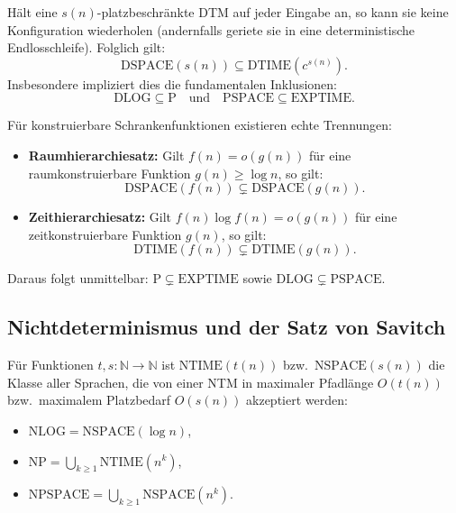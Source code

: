 \begin{theorem}
    Hält eine $s(n)$-platzbeschränkte DTM auf jeder Eingabe an, so kann sie keine Konfiguration wiederholen (andernfalls geriete sie in eine deterministische Endlosschleife). Folglich gilt:
    \[
        \mathrm{DSPACE}(s(n)) \subseteq \mathrm{DTIME}(c^{s(n)}).
    \]
    Insbesondere impliziert dies die fundamentalen Inklusionen:
    \[
        \mathrm{DLOG} \subseteq \mathrm{P} \quad \text{und} \quad \mathrm{PSPACE} \subseteq \mathrm{EXPTIME}.
    \]
\end{theorem}

\begin{theorem}
    Für konstruierbare Schrankenfunktionen existieren echte Trennungen:
    \begin{itemize}
        \item \textbf{Raumhierarchiesatz:} Gilt $f(n) = o(g(n))$ für eine raumkonstruierbare Funktion $g(n) \ge \log n$, so gilt:
        \[
            \mathrm{DSPACE}(f(n)) \subsetneq \mathrm{DSPACE}(g(n)).
        \]
        \item \textbf{Zeithierarchiesatz:} Gilt $f(n) \log f(n) = o(g(n))$ für eine zeitkonstruierbare Funktion $g(n)$, so gilt:
        \[
            \mathrm{DTIME}(f(n)) \subsetneq \mathrm{DTIME}(g(n)).
        \]
    \end{itemize}
    Daraus folgt unmittelbar: $\mathrm{P} \subsetneq \mathrm{EXPTIME}$ sowie $\mathrm{DLOG} \subsetneq \mathrm{PSPACE}$.
\end{theorem}

\subsection{Nichtdeterminismus und der Satz von Savitch}

\begin{definition}
    Für Funktionen $t, s : \mathbb{N} \to \mathbb{N}$ ist $\mathrm{NTIME}(t(n))$ bzw.\ $\mathrm{NSPACE}(s(n))$ die Klasse aller Sprachen, die von einer NTM in maximaler Pfadlänge $O(t(n))$ bzw.\ maximalem Platzbedarf $O(s(n))$ akzeptiert werden:
    \begin{itemize}
        \item $\mathrm{NLOG} = \mathrm{NSPACE}(\log n)$,
        \item $\mathrm{NP} = \bigcup_{k \ge 1} \mathrm{NTIME}(n^k)$,
        \item $\mathrm{NPSPACE} = \bigcup_{k \ge 1} \mathrm{NSPACE}(n^k)$.
    \end{itemize}
\end{definition}

